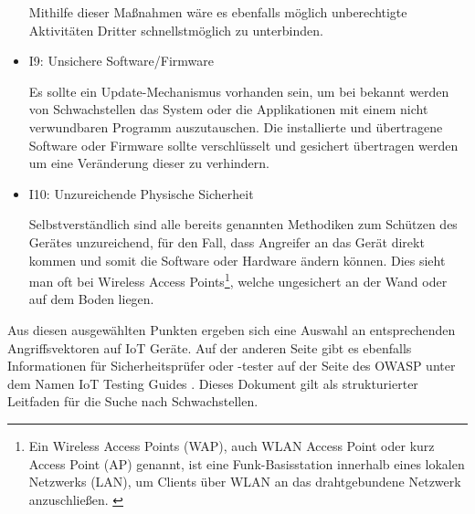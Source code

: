 \begin{itemize}
        Mithilfe dieser Maßnahmen wäre es ebenfalls möglich unberechtigte Aktivitäten Dritter schnellstmöglich zu unterbinden.
        
        \item I9: Unsichere Software/Firmware
        
        Es sollte ein Update-Mechanismus vorhanden sein, um bei bekannt werden von Schwachstellen das System oder die Applikationen mit einem nicht verwundbaren Programm auszutauschen. 
        Die installierte und übertragene Software oder Firmware sollte verschlüsselt und gesichert übertragen werden um eine Veränderung dieser zu verhindern.
        
        \item I10: Unzureichende Physische Sicherheit
        
        Selbstverständlich sind alle bereits genannten Methodiken zum Schützen des Gerätes unzureichend, für den Fall, dass Angreifer an das Gerät direkt kommen und somit die Software oder Hardware ändern können. Dies sieht man oft bei Wireless Access Points\footnote{\glqq Ein Wireless Access Points (WAP), auch WLAN Access Point oder kurz Access Point (AP) genannt, ist eine Funk-Basisstation innerhalb eines lokalen Netzwerks (LAN), um Clients über WLAN an das drahtgebundene Netzwerk anzuschließen.\grqq{} \cite{elektronik_kompendium_2018}}, welche ungesichert an der Wand oder auf dem Boden liegen.
    \end{itemize}
    
    Aus diesen ausgewählten Punkten ergeben sich eine Auswahl an entsprechenden Angriffsvektoren auf \ac{IoT} Geräte. Auf der anderen Seite gibt es ebenfalls Informationen für Sicherheitsprüfer oder -tester auf der Seite des \ac{OWASP} unter dem Namen \glqq IoT Testing Guides\grqq{} \cite{smith_2016}. Dieses Dokument gilt als strukturierter Leitfaden für die Suche nach Schwachstellen.
    
